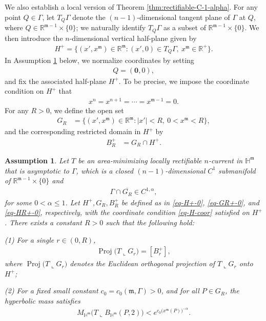 \documentclass[11pt,reqno]{amsart}
\newcommand{\fm}{\mathfrak{m}}
\renewcommand{\leq}{\leqslant}
\newtheorem{assumption}[theorem]{Assumption}
\theoremstyle{definition}
\numberwithin{equation}{section}
\begin{document}
We also establish a local version of Theorem \ref{thm:rectifiable-C-1-alpha}. For any point $Q \in \Gamma$, let $T_Q\Gamma$ denote the $(n-1)$-dimensional tangent plane of $\Gamma$ at $Q$, where $Q\in \mathbb{R}^{\fm-1} \times \{0\}$; we naturally identify $T_Q\Gamma$ as a subset of $\mathbb{R}^{\fm-1} \times \{0\}$. We then introduce the $n$-dimensional vertical half-plane given by
\begin{align}\label{eq-H+-0}
    H^+ = \bigl\{(x', x^\fm)\in \mathbb{R}^\fm: (x',0) \in T_Q\Gamma,\ x^\fm \in \mathbb{R}^+\bigr\}.
\end{align}
In Assumption \ref{assmp-local} below, we normalize coordinates by setting
\begin{align}\label{eq-Q-coor}
    Q= (\mathbf{0},0),
\end{align}
and fix the associated half-plane $H^+$. To be precise, we impose the coordinate condition on $H^+$ that
\begin{align}\label{eq-H-coor}
    x^n = x^{n+1} = \cdots = x^{\fm-1}=0.
\end{align}
For any $R>0$, we define the open set
\begin{align}\label{eq-GR+-0}
    G_R &= \bigl\{(x', x^\fm)\in \mathbb{R}^\fm: |x'|<R,\ 0<x^\fm <R\bigr\},
\end{align}
and the corresponding restricted domain in $H^+$ by
\begin{align}\label{eq-HR+-0}
    B_R^+ &= G_R\cap H^+.
\end{align}



\begin{assumption}\label{assmp-local}
Let $T$ be an area-minimizing locally rectifiable $n$-current in $\mathbb{H}^\fm$ that is asymptotic to $\Gamma$, which is a closed $(n-1)$-dimensional $C^{1}$ submanifold of $\mathbb{R}^{\fm-1} \times \{0\}$ and
\begin{align}\label{local-C1alpha}
    \Gamma \cap \overline{G_R}\in C^{1,\alpha},
\end{align}
for some $0<\alpha\leq 1$.
Let $H^+, G_R, B_R^+$ be defined as in \eqref{eq-H+-0}, \eqref{eq-GR+-0}, and \eqref{eq-HR+-0}, respectively, with the coordinate condition \eqref{eq-H-coor} satisfied on $H^+$. There exists a constant $R>0$ such that the following hold:

(1) For a single $r\in (0,R)$,
\begin{align}\label{eq-Proj-0}
     \operatorname{Proj}\bigl(T \mathbin{\llcorner} G_r\bigr)  = [B^+_r],
 \end{align}
 where $\operatorname{Proj}\bigl(T \mathbin{\llcorner} G_r\bigr)$ denotes the Euclidean orthogonal projection of $T \mathbin{\llcorner} G_r$ onto $H^+$;

(2) For a fixed small constant $c_0 = c_0(\fm, \Gamma) > 0$, and for all $P \in G_R$, the hyperbolic mass satisfies
\begin{align}\label{eq-mass-assump}
     M_{\mathbb{H}^\fm}\bigl(T \mathbin{\llcorner} B_{\mathbb{H}^\fm}(P, 2)\bigr) < e^{c_0 \bigl(x^\fm(P)\bigr)^{-\alpha}}.
\end{align}
\end{assumption}
\end{document}
